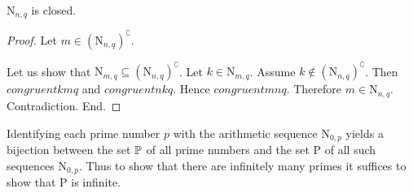 \documentclass{article}
\let\oldcomplement\complement
\renewcommand{\complement}[1]{\left(#1\right)^{\oldcomplement}}
\newcommand{\arithseq}[2]{\mathrm{N}_{#1,#2}}
\newcommand{\Ps}{\mathrm{P}}
\begin{document}
  \begin{forthel}
    \begin{lemma}
      $\arithseq{n}{q}$ is closed.
    \end{lemma}
    \begin{proof}
      Let $m \in \complement{\arithseq{n}{q}}$.

      Let us show that $\arithseq{m}{q} \subseteq \complement{\arithseq{n}{q}}$.
        Let $k \in \arithseq{m}{q}$.
        Assume $k \notin \complement{\arithseq{n}{q}}$.
        Then $congruent{k}{m}{q}$ and $congruent{n}{k}{q}$.
        Hence $congruent{m}{n}{q}$.
        Therefore $m \in \arithseq{n}{q}$.
        Contradiction.
      End.
    \end{proof}
  \end{forthel}

  Identifying each prime number $p$ with the arithmetic sequence $\arithseq{0}{p}$
  yields a bijection between the set $\mathbb{P}$ of all prime numbers and the set
  $\Ps$ of all such sequences $\arithseq{0}{p}$.
  Thus to show that there are infinitely many primes it suffices to show that
  $\Ps$ is infinite.
\end{document}
